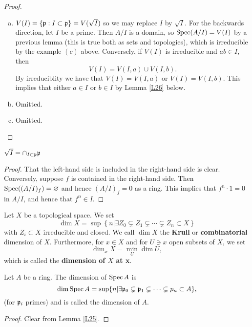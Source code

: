\documentclass{../mathnotes}
\begin{document}
\begin{proof}\hspace{1mm}
\begin{enumerate}[(a)]
\item $V(I)=\{\mathfrak p:I\subset\mathfrak p\}=V(\sqrt{I})$ so we may replace $I$ by $\sqrt{I}$. For the backwards direction, let $I$ be a prime. Then $A/I$ is a domain, so $\operatorname{Spec}(A/I)=V(I)$ by a previous lemma (this is true both as sets and topologies), which is irreducible by the example $(c)$ above. Conversely, if $V(I)$ is irreducible and $ab\in I$, then
\[V(I)=V(I,a)\cup V(I,b).\]
By irreduciblity we have that $V(I)=V(I,a)$ or $V(I)=V(I,b)$. This implies that either $a\in I$ or $b\in I$ by Lemma \ref{L26} below.
\item Omitted.
\item Omitted.
\end{enumerate}
\end{proof}

\begin{lem}
\label{L26}
$\sqrt{I}=\cap_{I\subset\mathfrak p} \mathfrak p$
\end{lem}
\begin{proof}
That the left-hand side is included in the right-hand side is clear. Conversely, suppose $f$ is contained in the right-hand side. Then $\operatorname{Spec}((A/I)_f)=\varnothing$ and hence $(A/I)_f=0$ as a ring. This implies that $f^n\cdot 1=0$ in $A/I$, and hence that $f^n\in I$.
\end{proof}

\begin{defn}
Let $X$ be a topological space. We set
\[\dim X=\sup\left\{ n | \exists Z_0 \subsetneq Z_1\subsetneq \cdots\subsetneq Z_n\subset X \right\}\]
with $Z_i\subset X$ irreducible and closed. We call $\dim X$ the \textbf{Krull} or \textbf{combinatorial} dimension of $X$. Furthermore, for $x\in X$ and for $U\ni x$ open subsets of $X$, we set
\[\dim_x X=\min_U\dim U,\]
which is called the \textbf{dimension of $X$ at x}.
\end{defn}

\begin{lem}
\label{L27}
Let $A$ be a ring. The dimension of $\operatorname{Spec} A$ is
\[\dim\operatorname{Spec} A=\sup\{n | \exists \mathfrak p_0\subsetneq\mathfrak p_1\subsetneq\cdots\subsetneq p_n\subset A \},\]
(for $\mathfrak p_i$ primes) and is called the dimension of $A$.
\end{lem}
\begin{proof}
Clear from Lemma \ref{L25}.
\end{proof}
\end{document}
